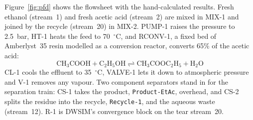 \documentclass[10pt,a4paper]{article}
\begin{document}
Figure~\ref{fig:pfd} shows the flowsheet with the hand-calculated results. Fresh ethanol (stream~1) and fresh acetic acid (stream~2) are mixed in MIX-1 and joined by the recycle (stream~20) in MIX-2. PUMP-1 raises the pressure to 2.5~bar, HT-1 heats the feed to 70~$^\circ$C, and RCONV-1, a fixed bed of Amberlyst~35 resin modelled as a conversion reactor, converts 65\% of the acetic acid:
\begin{equation}
\mathrm{CH_3COOH + C_2H_5OH \rightleftharpoons CH_3COOC_2H_5 + H_2O}
\label{eq:rxn}
\end{equation}
CL-1 cools the effluent to 35~$^\circ$C, VALVE-1 lets it down to atmospheric pressure and V-1 removes any vapour. Two component separators stand in for the separation train: CS-1 takes the product, \texttt{Product-EtAc}, overhead, and CS-2 splits the residue into the recycle, \texttt{Recycle-1}, and the aqueous waste (stream~12). R-1 is DWSIM's convergence block on the tear stream~20.
\end{document}
